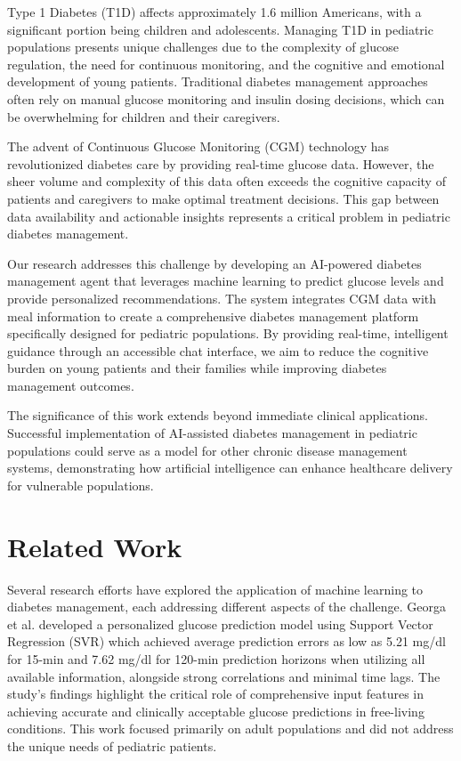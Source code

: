 \documentclass[acmsmall]{acmart}
\begin{document}
Type 1 Diabetes (T1D) affects approximately 1.6 million Americans, with a significant portion being children and adolescents. Managing T1D in pediatric populations presents unique challenges due to the complexity of glucose regulation, the need for continuous monitoring, and the cognitive and emotional development of young patients. Traditional diabetes management approaches often rely on manual glucose monitoring and insulin dosing decisions, which can be overwhelming for children and their caregivers.

The advent of Continuous Glucose Monitoring (CGM) technology has revolutionized diabetes care by providing real-time glucose data. However, the sheer volume and complexity of this data often exceeds the cognitive capacity of patients and caregivers to make optimal treatment decisions. This gap between data availability and actionable insights represents a critical problem in pediatric diabetes management.

Our research addresses this challenge by developing an AI-powered diabetes management agent that leverages machine learning to predict glucose levels and provide personalized recommendations. The system integrates CGM data with meal information to create a comprehensive diabetes management platform specifically designed for pediatric populations. By providing real-time, intelligent guidance through an accessible chat interface, we aim to reduce the cognitive burden on young patients and their families while improving diabetes management outcomes.

The significance of this work extends beyond immediate clinical applications. Successful implementation of AI-assisted diabetes management in pediatric populations could serve as a model for other chronic disease management systems, demonstrating how artificial intelligence can enhance healthcare delivery for vulnerable populations.

\section{Related Work}

Several research efforts have explored the application of machine learning to diabetes management, each addressing different aspects of the challenge. Georga et al. \cite{Georga2013} developed a personalized glucose prediction model using Support Vector Regression (SVR) which achieved average prediction errors as low as 5.21 mg/dl for 15-min and 7.62 mg/dl for 120-min prediction horizons when utilizing all available information, alongside strong correlations and minimal time lags. The study's findings highlight the critical role of comprehensive input features in achieving accurate and clinically acceptable glucose predictions in free-living conditions. This work focused primarily on adult populations and did not address the unique needs of pediatric patients.
\end{document}
